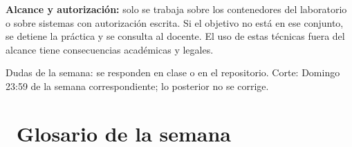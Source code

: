 \documentclass[11pt,a4paper]{article}
\newcommand{\iconotexto}[2]{\textcolor{cyanNeon}{\faIcon{#1}}~#2}
\begin{document}
\begin{tcolorbox}[cajaMejora]\textbf{Alcance y autorización:} solo se trabaja sobre los contenedores del laboratorio o sobre sistemas con autorización escrita. Si el objetivo no está en ese conjunto, se detiene la práctica y se consulta al docente. El uso de estas técnicas fuera del alcance tiene consecuencias académicas y legales.
\end{tcolorbox}

\begin{cajaRecuerda}Dudas de la semana: se responden en clase o en el repositorio. Corte: Domingo 23:59 de la semana correspondiente; lo posterior no se corrige.
\end{cajaRecuerda}

\clearpage

\section{\iconotexto{book}{Glosario de la semana}}
\end{document}
